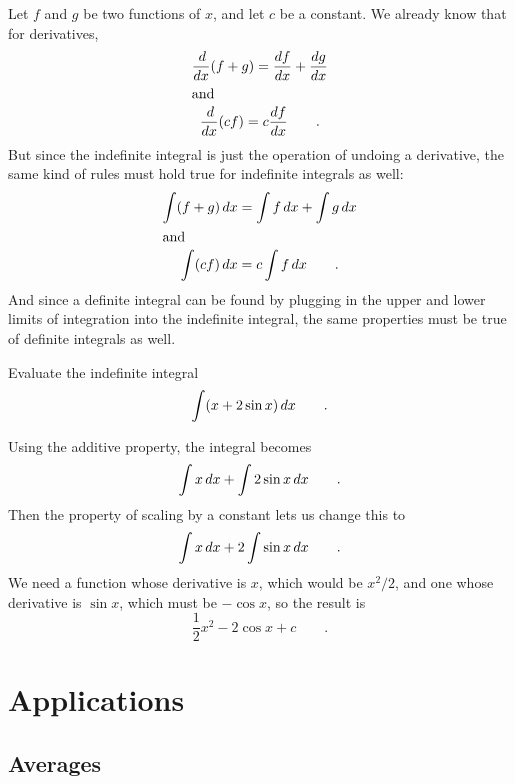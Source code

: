 Let $f$ and $g$ be two functions of $x$, and let $c$ be a constant. We already know that for derivatives,
\begin{gather*}
  \frac{\der}{\der x}(f+g) = \frac{\der f}{\der x} + \frac{\der g}{\der x} \\
\intertext{and}
  \frac{\der}{\der x}(cf) = c\frac{\der f}{\der x} \qquad .
\end{gather*}
But since the indefinite integral is just the operation of undoing a derivative, the
same kind of rules must hold true for indefinite integrals as well:
\begin{gather*}
  \int(f+g)\mathop{d\!} x =   \int f \mathop{d\!} x +   \int g \mathop{d\!} x \\
\intertext{and}
  \int(cf)\mathop{d\!} x =   c \int f \mathop{d\!} x \qquad .
\end{gather*}
And since a definite integral can be found by plugging in the upper and lower limits of integration
into the indefinite integral, the same properties must be true of definite integrals as well.

\begin{eg}
\egquestion Evaluate the indefinite integral
\begin{equation*}
  \int (x+2\sin x) \mathop{d\!} x \qquad .
\end{equation*}

\eganswer
Using the additive property, the integral becomes
\begin{equation*}
 \int x \mathop{d\!} x +   \int 2\sin x \mathop{d\!} x \qquad .
\end{equation*}
Then the property of scaling by a constant lets us change this to
\begin{equation*}
                             \int x \mathop{d\!} x +   2 \int \sin x \mathop{d\!} x \qquad .
\end{equation*}
We need a function whose derivative is $x$, which would be $x^2/2$, and
one whose derivative is $\sin x$, which must be $-\cos x$, so the result is
\begin{equation*}
                             \frac{1}{2}x^2 -   2 \cos x + c \qquad .
\end{equation*}
\end{eg}

\section{Applications}

\subsection{Averages}

